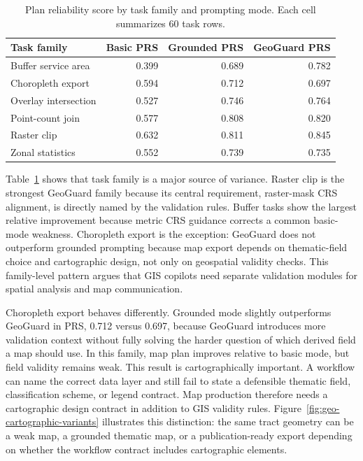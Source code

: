 \documentclass[12pt]{gsis}  %
\begin{document}
\begin{table}[htbp]
\centering
\caption{Plan reliability score by task family and prompting mode. Each cell summarizes 60 task rows.}
\label{tab:category-summary}
\small
\setlength{\tabcolsep}{4pt}
\begin{tabular}{lrrr}
\toprule
Task family & Basic PRS & Grounded PRS & GeoGuard PRS \\
\midrule
Buffer service area & 0.399 & 0.689 & 0.782 \\
Choropleth export & 0.594 & 0.712 & 0.697 \\
Overlay intersection & 0.527 & 0.746 & 0.764 \\
Point-count join & 0.577 & 0.808 & 0.820 \\
Raster clip & 0.632 & 0.811 & 0.845 \\
Zonal statistics & 0.552 & 0.739 & 0.735 \\
\bottomrule
\end{tabular}
\end{table}

Table~\ref{tab:category-summary} shows that task family is a major source of variance. Raster clip is the strongest GeoGuard family because its central requirement, raster-mask CRS alignment, is directly named by the validation rules. Buffer tasks show the largest relative improvement because metric CRS guidance corrects a common basic-mode weakness. Choropleth export is the exception: GeoGuard does not outperform grounded prompting because map export depends on thematic-field choice and cartographic design, not only on geospatial validity checks. This family-level pattern argues that GIS copilots need separate validation modules for spatial analysis and map communication.

Choropleth export behaves differently. Grounded mode slightly outperforms GeoGuard in PRS, 0.712 versus 0.697, because GeoGuard introduces more validation context without fully solving the harder question of which derived field a map should use. In this family, map plan improves relative to basic mode, but field validity remains weak. This result is cartographically important. A workflow can name the correct data layer and still fail to state a defensible thematic field, classification scheme, or legend contract. Map production therefore needs a cartographic design contract in addition to GIS validity rules. Figure~\ref{fig:geo-cartographic-variants} illustrates this distinction: the same tract geometry can be a weak map, a grounded thematic map, or a publication-ready export depending on whether the workflow contract includes cartographic elements.
\end{document}
